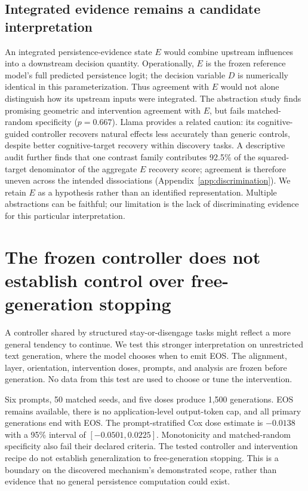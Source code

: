 \documentclass{article}
\begin{document}
\subsection{Integrated evidence remains a candidate interpretation}
An integrated persistence-evidence state $E$ would combine upstream influences into a downstream decision quantity. Operationally, $E$ is the frozen reference model's full predicted persistence logit; the decision variable $D$ is numerically identical in this parameterization. Thus agreement with $E$ would not alone distinguish how its upstream inputs were integrated. The abstraction study finds promising geometric and intervention agreement with $E$, but fails matched-random specificity ($p=0.667$). Llama provides a related caution: its cognitive-guided controller recovers natural effects less accurately than generic controls, despite better cognitive-target recovery within discovery tasks. A descriptive audit further finds that one contrast family contributes 92.5\% of the squared-target denominator of the aggregate $E$ recovery score; agreement is therefore uneven across the intended dissociations (Appendix~\ref{app:discrimination}). We retain $E$ as a hypothesis rather than an identified representation. Multiple abstractions can be faithful; our limitation is the lack of discriminating evidence for this particular interpretation.

\section{The frozen controller does not establish control over free-generation stopping}\label{sec:ood}
A controller shared by structured stay-or-disengage tasks might reflect a more general tendency to continue. We test this stronger interpretation on unrestricted text generation, where the model chooses when to emit EOS. The alignment, layer, orientation, intervention doses, prompts, and analysis are frozen before generation. No data from this test are used to choose or tune the intervention.

Six prompts, 50 matched seeds, and five doses produce 1,500 generations. EOS remains available, there is no application-level output-token cap, and all primary generations end with EOS. The prompt-stratified Cox dose estimate is $-0.0138$ with a 95\% interval of $[-0.0501,0.0225]$. Monotonicity and matched-random specificity also fail their declared criteria. The tested controller and intervention recipe do not establish generalization to free-generation stopping. This is a boundary on the discovered mechanism's demonstrated scope, rather than evidence that no general persistence computation could exist.
\end{document}
